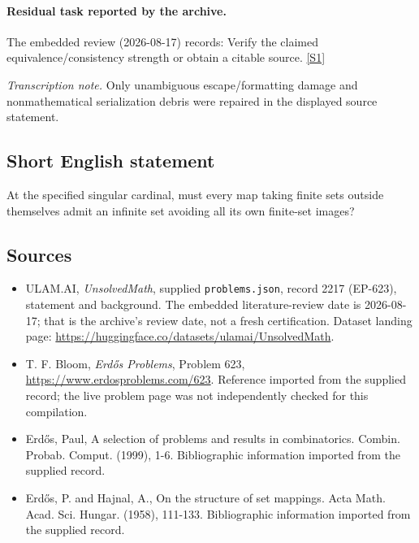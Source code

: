 \documentclass[11pt,a4paper]{article}
\newcommand{\sref}[2]{\hyperlink{source:#1:#2}{[S#2]}}
\begin{document}
\paragraph{Residual task reported by the archive.}

The embedded review (2026-08-17) records: Verify the claimed equivalence/consistency strength or obtain a citable source. \sref{2217}{1}

{\small\emph{Transcription note.} Only unambiguous escape/formatting damage and nonmathematical serialization debris were repaired in the displayed source statement.}

\subsection{Short English statement}

At the specified singular cardinal, must every map taking finite sets outside themselves admit an infinite set avoiding all its own finite-set images?

\subsection{Sources}

{\small

\begin{itemize}

\item[\hypertarget{source:2217:1}{S1}] ULAM.AI, \emph{UnsolvedMath}, supplied \texttt{problems.json}, record 2217 (EP-623), statement and background. The embedded literature-review date is 2026-08-17; that is the archive’s review date, not a fresh certification. Dataset landing page: \url{https://huggingface.co/datasets/ulamai/UnsolvedMath}.

\item[\hypertarget{source:2217:2}{S2}] T. F. Bloom, \emph{Erdős Problems}, Problem 623, \url{https://www.erdosproblems.com/623}. Reference imported from the supplied record; the live problem page was not independently checked for this compilation.

\item[\hypertarget{source:2217:3}{S3}] Erd\H{o}s, Paul, A selection of problems and results in combinatorics. Combin. Probab. Comput. (1999), 1-6. Bibliographic information imported from the supplied record.

\item[\hypertarget{source:2217:4}{S4}] Erd\H{o}s, P. and Hajnal, A., On the structure of set mappings. Acta Math. Acad. Sci. Hungar. (1958), 111-133. Bibliographic information imported from the supplied record.

\end{itemize}

}

\label{end:2217}
\end{document}
